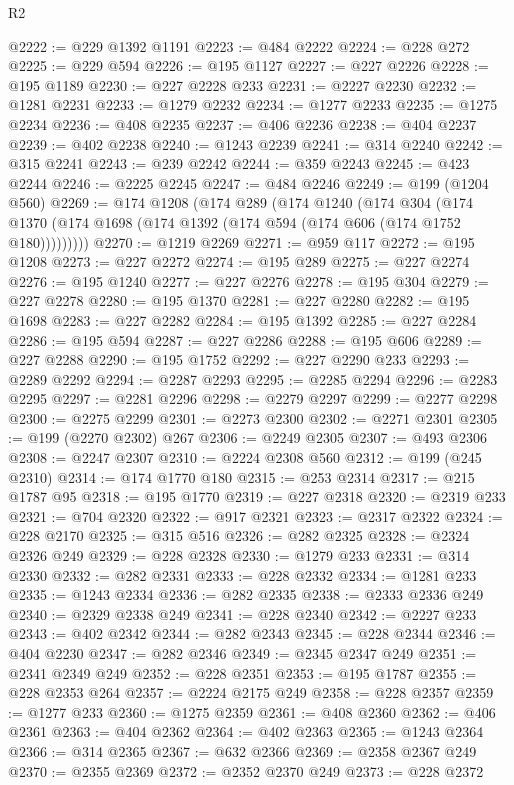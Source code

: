 \begin{lexlean}{R2}
\begin{coremodule}
@2222 := @229 @1392 @1191
@2223 := @484 @2222
@2224 := @228 @272
@2225 := @229 @594
@2226 := @195 @1127
@2227 := @227 @2226
@2228 := @195 @1189
@2230 := @227 @2228 @233
@2231 := @2227 @2230
@2232 := @1281 @2231
@2233 := @1279 @2232
@2234 := @1277 @2233
@2235 := @1275 @2234
@2236 := @408 @2235
@2237 := @406 @2236
@2238 := @404 @2237
@2239 := @402 @2238
@2240 := @1243 @2239
@2241 := @314 @2240
@2242 := @315 @2241
@2243 := @239 @2242
@2244 := @359 @2243
@2245 := @423 @2244
@2246 := @2225 @2245
@2247 := @484 @2246
@2249 := @199 (@1204 @560)
@2269 := @174
    @1208
    (@174
      @289
      (@174
        @1240
        (@174
          @304
          (@174 @1370 (@174 @1698 (@174 @1392 (@174 @594 (@174 @606 (@174 @1752 @180)))))))))
@2270 := @1219 @2269
@2271 := @959 @117
@2272 := @195 @1208
@2273 := @227 @2272
@2274 := @195 @289
@2275 := @227 @2274
@2276 := @195 @1240
@2277 := @227 @2276
@2278 := @195 @304
@2279 := @227 @2278
@2280 := @195 @1370
@2281 := @227 @2280
@2282 := @195 @1698
@2283 := @227 @2282
@2284 := @195 @1392
@2285 := @227 @2284
@2286 := @195 @594
@2287 := @227 @2286
@2288 := @195 @606
@2289 := @227 @2288
@2290 := @195 @1752
@2292 := @227 @2290 @233
@2293 := @2289 @2292
@2294 := @2287 @2293
@2295 := @2285 @2294
@2296 := @2283 @2295
@2297 := @2281 @2296
@2298 := @2279 @2297
@2299 := @2277 @2298
@2300 := @2275 @2299
@2301 := @2273 @2300
@2302 := @2271 @2301
@2305 := @199 (@2270 @2302) @267
@2306 := @2249 @2305
@2307 := @493 @2306
@2308 := @2247 @2307
@2310 := @2224 @2308 @560
@2312 := @199 (@245 @2310)
@2314 := @174 @1770 @180
@2315 := @253 @2314
@2317 := @215 @1787 @95
@2318 := @195 @1770
@2319 := @227 @2318
@2320 := @2319 @233
@2321 := @704 @2320
@2322 := @917 @2321
@2323 := @2317 @2322
@2324 := @228 @2170
@2325 := @315 @516
@2326 := @282 @2325
@2328 := @2324 @2326 @249
@2329 := @228 @2328
@2330 := @1279 @233
@2331 := @314 @2330
@2332 := @282 @2331
@2333 := @228 @2332
@2334 := @1281 @233
@2335 := @1243 @2334
@2336 := @282 @2335
@2338 := @2333 @2336 @249
@2340 := @2329 @2338 @249
@2341 := @228 @2340
@2342 := @2227 @233
@2343 := @402 @2342
@2344 := @282 @2343
@2345 := @228 @2344
@2346 := @404 @2230
@2347 := @282 @2346
@2349 := @2345 @2347 @249
@2351 := @2341 @2349 @249
@2352 := @228 @2351
@2353 := @195 @1787
@2355 := @228 @2353 @264
@2357 := @2224 @2175 @249
@2358 := @228 @2357
@2359 := @1277 @233
@2360 := @1275 @2359
@2361 := @408 @2360
@2362 := @406 @2361
@2363 := @404 @2362
@2364 := @402 @2363
@2365 := @1243 @2364
@2366 := @314 @2365
@2367 := @632 @2366
@2369 := @2358 @2367 @249
@2370 := @2355 @2369
@2372 := @2352 @2370 @249
@2373 := @228 @2372

\end{coremodule}
\end{lexlean}
